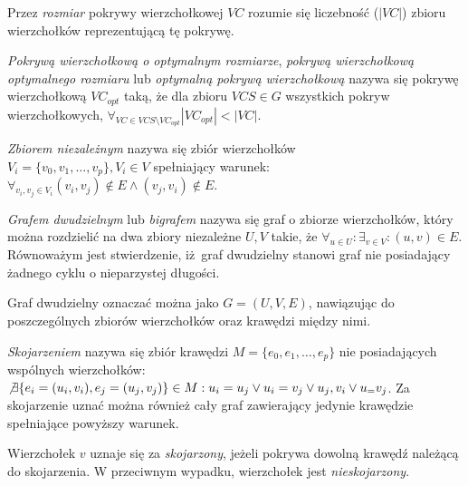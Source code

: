 \begin{definition}
  Przez \emph{rozmiar} pokrywy wierzchołkowej $VC$ rozumie się liczebność ($|VC|$)
  zbioru wierzchołków reprezentującą tę pokrywę.
\end{definition}

\begin{definition}
  \emph{Pokrywą wierzchołkową o optymalnym rozmiarze}, \emph{pokrywą 
  wierzchołkową optymalnego rozmiaru} lub \emph{optymalną pokrywą wierzchołkową} 
  nazywa się pokrywę wierzchołkową $VC_{opt}$ taką, że dla zbioru $VCS \in G$ 
  wszystkich pokryw wierzchołkowych, 
  $\forall_{VC \in VCS \setminus VC_{opt}}{|VC_{opt}| < |VC|}$.
\end{definition}

\begin{definition}
  \emph{Zbiorem niezależnym} nazywa się zbiór wierzchołków\\
  $V_i=\{v_0, v_1, \ldots, v_p \}, V_i \in V$ spełniający warunek:
  $\forall_{v_i, v_j \in V_i}{(v_i, v_j) \notin E \land (v_j, v_i) \notin E}$.
\end{definition}

\begin{definition}
  \emph{Grafem dwudzielnym} lub \emph{bigrafem} nazywa się graf o zbiorze 
  wierzchołków, który można rozdzielić na dwa zbiory niezależne $U, V$ takie, że
  $\forall_{u \in U}: \exists_{v \in V}: (u,v) \in E$.
  Równoważym jest stwierdzenie, iż graf dwudzielny stanowi graf nie posiadający
  żadnego cyklu o nieparzystej długości.


  Graf dwudzielny oznaczać można jako $G=(U,V,E)$, nawiązując do poszczególnych
  zbiorów wierzchołków oraz krawędzi między nimi.
\end{definition}

\begin{definition}
  \emph{Skojarzeniem} nazywa się zbiór krawędzi $M=\{e_0, e_1, \ldots, e_p\}$
  nie posiadających wspólnych wierzchołków: ${\not\exists{\{e_i=(u_i,v_i),
  e_j=(u_j, v_j)\} \in M}: u_i=u_j \lor u_i=v_j \lor u_j,v_i \lor u_=v_j}$.
  Za skojarzenie uznać można również cały graf zawierający jedynie krawędzie
  spełniające powyższy warunek.
\end{definition}

\begin{definition}
  Wierzchołek $v$ uznaje się za \emph{skojarzony}, jeżeli pokrywa dowolną
  krawędź należącą do skojarzenia.
  W przeciwnym wypadku, wierzchołek jest \emph{nieskojarzony}.
\end{definition}

